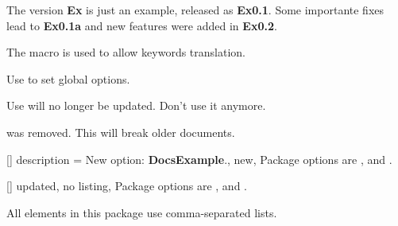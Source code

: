 \documentclass[11pt, outdir = ./out]{article}
\begin{document}
\begin{DocsExample}
    The version \textbf{Ex} is just an example, released as \textbf{Ex0.1}. Some importante fixes lead to \textbf{Ex0.1a} and new features were added in \textbf{Ex0.2}.
\end{DocsExample}

\begin{DocsExample}
    The  macro is used to allow keywords translation.
\end{DocsExample}

\begin{DocsExample}
    Use  to set global options.
\end{DocsExample}

\begin{DocsExample}
    Use  will no longer be updated. Don't use it anymore.
\end{DocsExample}

\begin{DocsExample}
     was removed. This will break older documents.
\end{DocsExample}

\begin{DocsExample}
    []{
        description = {New option:  \textbf{DocsExample}.},
        new,  %
    }%
    Package options are ,  and .
\end{DocsExample}

\begin{DocsExample}
    []{
        updated,
        no listing,  %
    }%
    Package options are ,  and .

    All elements in this package use comma-separated lists.
\end{DocsExample}

\printindex
\end{document}
